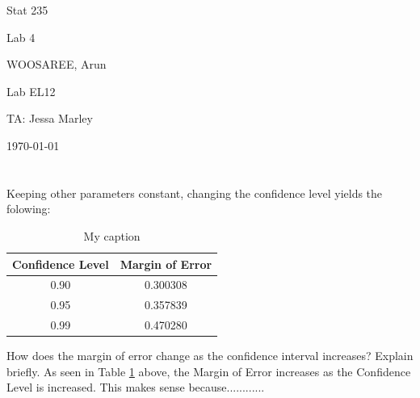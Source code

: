 \documentclass[letterpaper]{article}
\begin{document}
\begin{titlepage}
 \begin{center}
  \vspace*{1cm}
  \Huge
  Stat 235
  \vspace{1cm}
  
  Lab 4
  \vspace{1cm}
  
  WOOSAREE, Arun
  \vspace{1cm}
  
  \Huge
  Lab EL12
  \vspace{1cm}
  
  TA: Jessa Marley
  \vspace{1cm}
  
  \today
  \vfill
 \end{center}
\end{titlepage}

\section{}%

\subsection{}%
Keeping other parameters constant, changing the confidence level yields the folowing:
\begin{table}[H]
 \centering
 \begin{tabular}{|c|c|}
  \hline
  Confidence Level & Margin of Error \\ \hline
  0.90             & 0.300308        \\ \hline
  0.95             & 0.357839        \\ \hline
  0.99             & 0.470280        \\ \hline
 \end{tabular}
 \caption{My caption}
 \label{1a}
\end{table}
How does the margin of
error change as the confidence interval increases? Explain briefly.
As seen in Table \ref{1a} above, the Margin of Error increases as the
Confidence Level is increased. This makes sense because............


\subsection{}%
\end{document}
